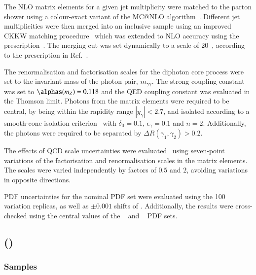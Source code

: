 The NLO matrix elements for a given jet multiplicity were matched to the parton
shower using a colour-exact variant of the MC@NLO algorithm~\cite{Hoeche:2011fd}. 
Different jet multiplicities were then merged
into an inclusive sample using an improved CKKW matching
procedure~\cite{Catani:2001cc,Hoeche:2009rj} which was extended to NLO
accuracy using the \MEPSatNLO prescription~\cite{Hoeche:2012yf}.
The merging cut was set dynamically to a scale of 20~\GeV{},
according to the prescription in Ref.~\cite{Siegert:2016bre}.

The renormalisation and factorisation scales for the diphoton core process
were set to the invariant mass of the photon pair, $m_{\gamma\gamma}$.
The strong coupling constant was set to $\alphas (m_Z)= 0.118$ and the QED coupling
constant was evaluated in the Thomson limit. Photons from the matrix elements were required to be central, 
by being within the rapidity range $|y_{\gamma}|<2.7$, and isolated according to a smooth-cone isolation 
criterion~\cite{Frixione:1998jh} with $\delta_0=0.1$, $\epsilon_{\gamma}=0.1$ and $n=2$. 
Additionally, the photons were required to be separated by $\Delta R(\gamma_1,\gamma_2) > 0.2$.


The effects of QCD scale uncertainties were evaluated~\cite{Bothmann:2016nao} using
seven-point variations of the factorisation and renormalisation scales in the matrix elements.
The scales were varied independently by factors of $0.5$ and $2$, avoiding variations in opposite directions.

PDF uncertainties for the nominal PDF set were
evaluated using the 100 variation replicas, as well as $\pm 0.001$ shifts
of \alphas. Additionally, the results were cross-checked using the central values of the 
\CT[14nnlo]~\cite{Dulat:2015mca} and \MMHT[nnlo]~\cite{Harland-Lang:2014zoa} 
PDF sets.




\subsection[Sherpa (MEPS@NLO)]{\SHERPA (\MEPSatNLO)}


\subsubsection*{Samples}

